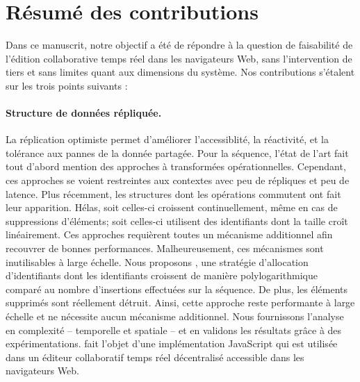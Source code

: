 
\section{Résumé des contributions}
\label{conclu:sec:summary}


Dans ce manuscrit, notre objectif a été de répondre à la question de faisabilité
de l'édition collaborative temps réel dans les navigateurs Web, sans
l'intervention de tiers et sans limites quant aux dimensions du système. Nos
contributions s'étalent sur les trois points suivants :

\paragraph{Structure de données répliquée.} La réplication optimiste permet
d'améliorer l'accessiblité, la réactivité, et la tolérance aux pannes de la
donnée partagée. Pour la séquence, l'état de l'art fait tout d'abord mention des
approches à transformées opérationnelles. Cependant, ces approches se voient
restreintes aux contextes avec peu de répliques et peu de latence. Plus
récemment, les structures dont les opérations commutent ont fait leur
apparition. Hélas, soit celles-ci croissent continuellement, même en cas de
suppressions d'éléments; soit celles-ci utilisent des identifiants dont la
taille croît linéairement. Ces approches requièrent toutes un mécanisme
additionnel afin recouvrer de bonnes performances. Malheureusement, ces
mécanismes sont inutilisables à large échelle. Nous proposons \LSEQ, une
stratégie d'allocation d'identifiants dont les identifiants croissent de manière
polylogarithmique comparé au nombre d'insertions effectuées sur la séquence. De
plus, les éléments supprimés sont réellement détruit. Ainsi, cette approche
reste performante à large échelle et ne nécessite aucun mécanisme additionnel.
Nous fournissons l'analyse en complexité -- temporelle et spatiale -- et en
validons les résultats grâce à des expérimentations. \LSEQ fait l'objet d'une
implémentation JavaScript qui est utilisée dans un éditeur collaboratif temps
réel décentralisé accessible dans les navigateurs Web.

